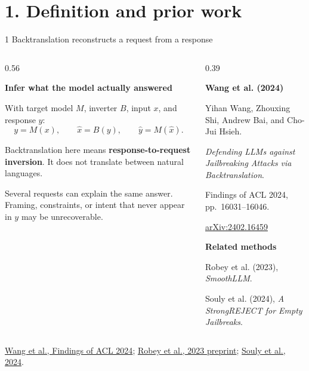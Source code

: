 \documentclass[aspectratio=169,10pt]{beamer}
\newcommand{\sources}[1]{{\fontsize{10.5}{13}\selectfont\color{Muted}#1\par}}
\newcommand{\lead}[1]{{\fontsize{24}{30}\selectfont\bfseries #1\par}\par\vspace{0.35cm}}
\newcommand{\subhead}[1]{{\color{Output}\bfseries #1\par}\par\vspace{0.18cm}}
\begin{document}
\section{1. Definition and prior work}
\begin{frame}{1 \quad Backtranslation reconstructs a request from a response}
 \begin{columns}[T,onlytextwidth]
  \begin{column}{0.56\textwidth}
   \lead{Infer what the model actually answered}
   With target model \(M\), inverter \(B\), input \(x\), and response \(y\):
   \[y=M(x), \qquad \widehat{x}=B(y), \qquad \widehat{y}=M(\widehat{x}).\]
   \par\vspace{0.25cm}
   Backtranslation here means \textbf{response-to-request inversion}. It does not translate between natural languages.
   \par\vspace{0.5cm}
   Several requests can explain the same answer. Framing, constraints, or intent that never appear in \(y\) may be unrecoverable.
  \end{column}
  \begin{column}{0.39\textwidth}
   \subhead{Wang et al. (2024)}
   Yihan Wang, Zhouxing Shi, Andrew Bai, and Cho-Jui Hsieh.\par\par\vspace{0.2cm}
   \emph{Defending LLMs against Jailbreaking Attacks via Backtranslation}.\par\par\vspace{0.2cm}
   Findings of ACL 2024, pp.\ 16031--16046.\par\par\vspace{0.35cm}
   \href{https://arxiv.org/abs/2402.16459}{arXiv:2402.16459}\par\par\vspace{0.5cm}
   \subhead{Related methods}
   Robey et al. (2023), \emph{SmoothLLM}.\par\par\vspace{0.18cm}
   Souly et al. (2024), \emph{A StrongREJECT for Empty Jailbreaks}.
  \end{column}
 \end{columns}
 \vfill
 \sources{\href{https://aclanthology.org/2024.findings-acl.948/}{Wang et al., Findings of ACL 2024}; \href{https://arxiv.org/abs/2310.03684}{Robey et al., 2023 preprint}; \href{https://arxiv.org/abs/2402.10260}{Souly et al., 2024}.}
\end{frame}
\end{document}
